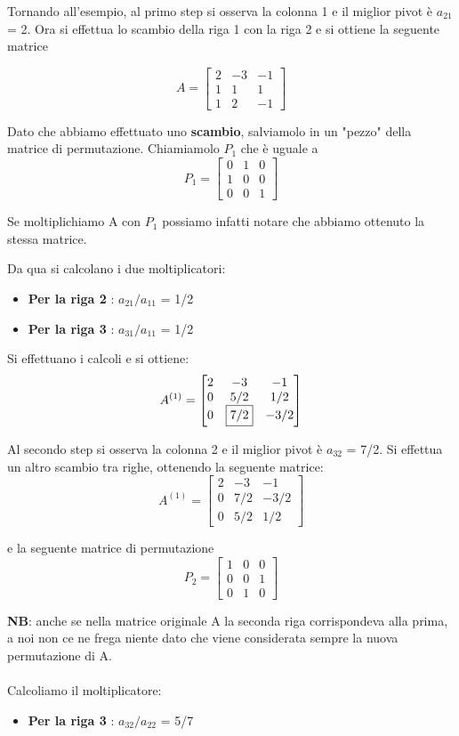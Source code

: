 Tornando all'esempio, al primo step si osserva la colonna 1 e il miglior pivot è $a_{21}$ = 2.
Ora si effettua lo scambio della riga 1 con la riga 2 e si ottiene la seguente matrice

$$ A =
\begin{bmatrix}
2 & -3 & -1 \\
1 & 1 & 1 \\
1 & 2 & -1 
\end{bmatrix}
$$

Dato che abbiamo effettuato uno \textbf{scambio}, salviamolo in un "pezzo" della matrice di permutazione. Chiamiamolo $P_1$ che è uguale a 
$$ P_1 =
\begin{bmatrix}
0 & 1 & 0 \\
1 & 0 & 0 \\
0 & 0 & 1 
\end{bmatrix}
$$

Se moltiplichiamo A con $P_1$ possiamo infatti notare che abbiamo ottenuto la stessa matrice.

Da qua si calcolano i due moltiplicatori:
\begin{itemize}
\item \textbf{Per la riga 2 }:  $a_{21}/a_{11}$ = 1/2
\item \textbf{Per la riga 3 }:  $a_{31}/a_{11}$ = 1/2
\end{itemize}

Si effettuano i calcoli e si ottiene:
$$ A^{(1)} =
\begin{bmatrix}
2 & -3 & -1 \\
0 & 5/2 & 1/2 \\
0 & \fbox{7/2} & -3/2 
\end{bmatrix}
$$

Al secondo step si osserva la colonna 2 e il miglior pivot è $a_{32}$ = 7/2. Si effettua un altro scambio tra righe, ottenendo la seguente matrice:
$$ A^{(1)} =
\begin{bmatrix}
2 & -3 & -1 \\
0 & 7/2 & -3/2 \\
0 & 5/2 & 1/2 
\end{bmatrix}
$$

e la seguente matrice di permutazione
$$ P_2 =
\begin{bmatrix}
1 & 0 & 0 \\
0 & 0 & 1 \\
0 & 1 & 0 
\end{bmatrix}
$$

\textbf{NB}: anche se nella matrice originale A la seconda riga corrispondeva alla prima, a noi non ce ne frega niente dato che viene considerata sempre la nuova permutazione di A.
\\ \\
Calcoliamo il moltiplicatore:
\begin{itemize}
\item \textbf{Per la riga 3 }:  $a_{32}/a_{22}$ = 5/7
\end{itemize}


